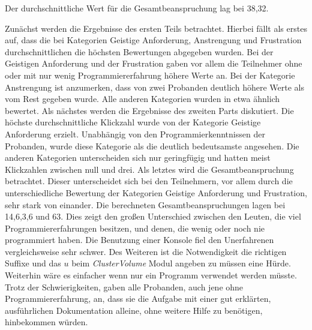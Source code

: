 \begin{table}[H]
\centering
{}
\caption{Durchschnittlichen Ergebnisse des NASA-TLX Bogens}
\label{tab:ergebnis_nasa}
\end{table}


Der durchschnittliche Wert für die Gesamtbeanspruchung lag bei 38,32. 


Zunächst werden die Ergebnisse des ersten Teils betrachtet. Hierbei fällt als erstes auf, dass die bei Kategorien Geistige Anforderung, Anstrengung und Frustration durchschnittlichen die höchsten Bewertungen abgegeben wurden.
Bei der Geistigen Anforderung und der Frustration gaben vor allem die Teilnehmer ohne oder mit nur wenig Programmiererfahrung höhere Werte an. Bei der Kategorie Anstrengung ist anzumerken, dass von zwei Probanden deutlich höhere Werte als vom Rest gegeben wurde.
Alle anderen Kategorien wurden in etwa ähnlich bewertet.
\newline
Als nächstes werden die Ergebnisse des zweiten Parts diskutiert. Die höchste durchschnittliche Klickzahl wurde von der Kategorie Geistige Anforderung erzielt. Unabhängig von den Programmierkenntnissen der Probanden, wurde diese Kategorie als die deutlich bedeutsamste angesehen.
Die anderen Kategorien unterscheiden sich nur geringfügig und hatten meist Klickzahlen zwischen null und drei.
\newline
Als letztes wird die Gesamtbeanspruchung betrachtet. Dieser unterscheidet sich bei den Teilnehmern, vor allem durch die unterschiedliche Bewertung der Kategorien Geistige Anforderung und Frustration, sehr stark von einander.
Die berechneten Gesamtbeanspruchungen lagen bei 14,6,3,6 und 63. Dies zeigt den großen Unterschied zwischen den Leuten, die viel Programmiererfahrungen besitzen, und denen, die wenig oder noch nie programmiert haben.
Die Benutzung einer Konsole fiel den Unerfahrenen vergleichsweise sehr schwer. Des Weiteren ist die Notwendigkeit die richtigen Suffixe und das $u$ beim \textit{ClusterVolume} Modul angeben zu müssen eine Hürde. Weiterhin wäre es einfacher wenn nur ein Programm verwendet werden müsste.
\newline 
Trotz der Schwierigkeiten, gaben alle Probanden, auch jene ohne Programmiererfahrung, an, dass sie die Aufgabe mit einer gut erklärten, ausführlichen Dokumentation alleine, ohne weitere Hilfe zu benötigen, hinbekommen würden.

